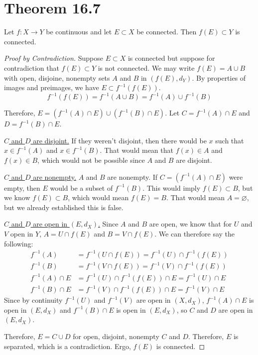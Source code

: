 \documentclass[11pt]{article}
\begin{document}
\newcommand{\seq}[2][n]{\ensuremath{\left\{ #2 _{#1} \right\}}}
\section{Theorem 16.7}
    Let $f: X \to Y$ be continuous and let $E \subset X$ be connected.
    Then $f(E) \subset Y$ is connected.
    \begin{proof}[Proof by Contradiction]
        Suppose $E \subset X$ is connected but suppose for contradiction that $f(E) \subset Y$ is not connected.
        We may write $f(E) = A \cup B$ with open, disjoine, nonempty sets $A$ and $B$ in $(f(E), d_Y)$.
        By properties of images and preimages, we have $E \subset f^{-1}(f(E))$.
        \begin{equation}
            f^{-1}(f(E)) = f^{-1}(A \cup B) = f^{-1}(A) \cup f^{-1}(B)
        \end{equation}

        Therefore, $E = (f^{-1}(A) \cap E) \cup (f^{-1}(B) \cap E)$.
        Let $C = f^{-1}(A) \cap E$ and $D = f^{-1}(B) \cap E$.

        \underline{$C$ and $D$ are disjoint.}
            If they weren't disjoint, then there would be $x$ such that $x \in f^{-1}(A)$ and $x \in f^{-1}(B)$.
            That would mean that $f(x) \in A$ and $f(x) \in B$, which would not be possible since $A$ and $B$ are disjoint.

        \underline{$C$ and $D$ are nonempty.}
            $A$ and $B$ are nonempty.
            If $C = (f^{-1}(A) \cap E)$ were empty, then $E$ would be a subset of $f^{-1}(B)$.
            This would imply $f(E) \subset B$, but we know $f(E) \subset B$, which would mean $f(E) = B$.
            That would mean $A = \varnothing$, but we already established this is false.
        
        \underline{$C$ and $D$ are open in $(E,d_X)$.}
            Since $A$ and $B$ are open, we know that for $U$ and $V$ open in $Y$, $A = U \cap f(E)$ and $B = V \cap f(E)$.
            We can therefore say the following:
            \begin{align}
                f^{-1}(A)   &=  f^{-1}(U \cap f(E)) 
                    =   f^{-1}(U) \cap f^{-1}(f(E))\\
                f^{-1}(B)   &=  f^{-1}(V \cap f(E)) 
                    =   f^{-1}(V) \cap f^{-1}(f(E))\\
                f^{-1}(A) \cap E    &=  f^{-1}(U) \cap f^{-1}(f(E)) \cap E
                    =   f^{-1}(U) \cap E\\
                f^{-1}(B) \cap E    &=  f^{-1}(V) \cap f^{-1}(f(E)) \cap E
                    =   f^{-1}(V) \cap E
            \end{align}
            Since by continuity $f^{-1}(U)$ and $f^{-1}(V)$ are open in $(X,d_X)$, $f^{-1}(A) \cap E$ is open in $(E,d_X)$ and $f^{-1}(B) \cap E$ is open in $(E,d_X)$, so $C$ and $D$ are open in $(E,d_X)$.

        Therefore, $E = C \cup D$ for open, disjoint, nonempty $C$ and $D$.
        Therefore, $E$ is separated, which is a contradiction.
        Ergo, $f(E)$ is connected.
    \end{proof}
\end{document}
